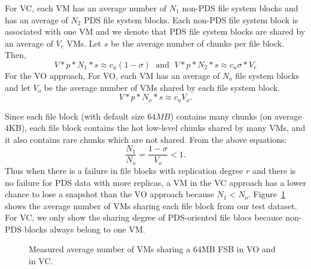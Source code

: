 For VC, each VM has an average number of $N_1$ non-PDS file system blocks
and  has  an average of  $N_2$ PDS file system blocks. 
Each non-PDS file system block is associated with one VM
 and  we denote that PDS file system blocks are
shared by an average of $V_c$ VMs. Let $s$ be the average number of chunks per file block. Then, 
\[
V *p*N_1 *s  \approx c_u (1-\sigma)\; \mbox{ and } \; 
V *p*N_2 *s  \approx c_u \sigma *V_c
\]
For the VO approach, 
For VO, each VM has an average  of  $N_o$ file system blocks
and let $V_o$ be the average number of VMs shared by each file system block.
\[
V *p*N_o *s  \approx c_u  V_o.
\]

Since each file block (with default size $64MB$) contains many chunks (on average 4KB),
each file block contains the hot low-level chunks shared by many VMs, and it also contains
rare chunks which are not shared.  From the above equations:
\[
\frac{N_1}{N_o}=  \frac{1-\sigma}{V_o}<1.
\] 
Thus when there is a failure in file blocks with replication degree $r$
and there is no failure for PDS data with more replicas,   a VM in
the VC approach has a lower chance to lose a snapshot than the VO approach because
$N_1<N_o$. 
Figure~\ref{fig:fsb-links} shows the average number of VMs sharing each file block from
our test dataset.
For VC, we only show
the sharing degree of  PDS-oriented file blocs  because non-PDS blocks always belong to
one VM.

\begin{figure}[htbp]
  \centering
  \caption{Measured average number of VMs sharing a 64MB FSB in VO and in VC.}
  \label{fig:fsb-links}
\end{figure}

